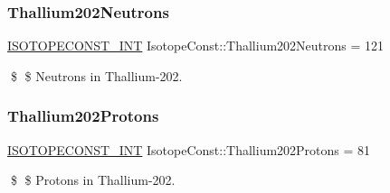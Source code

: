 \subsubsection{\texorpdfstring{Thallium202\+Neutrons}{Thallium202Neutrons}}
{\footnotesize\ttfamily \mbox{\hyperlink{group___isotope_const-_macros_ga5f18360b3e99483a35c32d789e62621c}{I\+S\+O\+T\+O\+P\+E\+C\+O\+N\+S\+T\+\_\+\+I\+NT}} Isotope\+Const\+::\+Thallium202\+Neutrons = 121}

\$ \$ Neutrons in Thallium-\/202. \mbox{\label{group___isotope_const-_thallium-_tl202_ga28978214e2c386867cb110b2ebdc0999}} 
\subsubsection{\texorpdfstring{Thallium202\+Protons}{Thallium202Protons}}
{\footnotesize\ttfamily \mbox{\hyperlink{group___isotope_const-_macros_ga5f18360b3e99483a35c32d789e62621c}{I\+S\+O\+T\+O\+P\+E\+C\+O\+N\+S\+T\+\_\+\+I\+NT}} Isotope\+Const\+::\+Thallium202\+Protons = 81}

\$ \$ Protons in Thallium-\/202. 